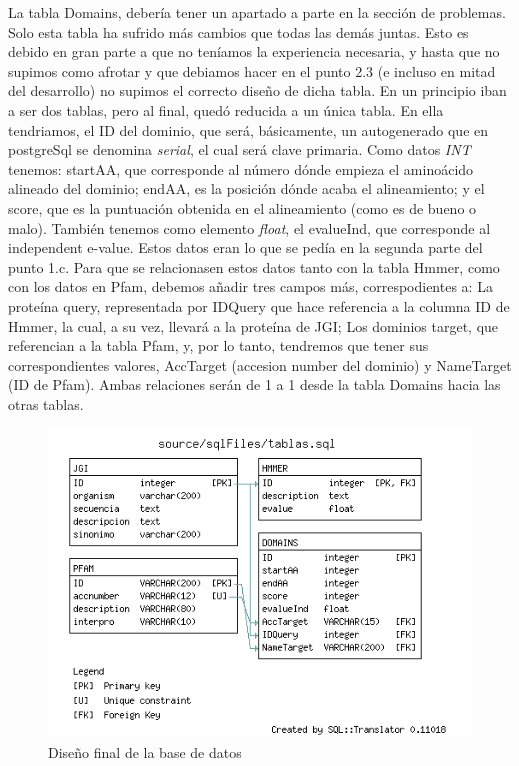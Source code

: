 \documentclass[11pt]{article} %
\begin{document}
La tabla Domains, deber\'ia tener un apartado a parte en la secci\'on de problemas. Solo esta tabla ha sufrido m\'as cambios que todas las dem\'as juntas. Esto es debido en gran parte a que no ten\'iamos la experiencia necesaria, y hasta que no supimos como afrotar y que debiamos hacer en el punto 2.3 (e incluso en mitad del desarrollo) no supimos el correcto dise\~no de dicha tabla. En un principio iban a ser dos tablas, pero al final, qued\'o reducida a un \'unica tabla. En ella tendriamos, el ID del dominio, que ser\'a, b\'asicamente, un autogenerado que en postgreSql se denomina \emph{serial}, el cual ser\'a clave primaria. Como datos \emph{INT} tenemos: startAA, que corresponde al n\'umero d\'onde empieza el amino\'acido alineado del dominio; endAA, es la posici\'on d\'onde acaba el alineamiento; y el score, que es la puntuaci\'on obtenida en el alineamiento (como es de bueno o malo). Tambi\'en tenemos como elemento \emph{float}, el evalueInd, que corresponde al independent e-value. Estos datos eran lo que se ped\'ia en la segunda parte del punto 1.c. Para que se relacionasen estos datos tanto con la tabla Hmmer, como con los datos en Pfam, debemos a\~nadir tres campos m\'as, correspodientes a: La prote\'ina query, representada por IDQuery que hace referencia a la columna ID de Hmmer, la cual, a su vez, llevar\'a a la prote\'ina de JGI; Los dominios target, que referencian a la tabla Pfam, y, por lo tanto, tendremos que tener sus correspondientes valores, AccTarget (accesion number del dominio) y NameTarget (ID de Pfam). Ambas relaciones ser\'an de 1 a 1 desde la tabla Domains hacia las otras tablas.


\begin{figure}
\centering
\includegraphics[width=15cm]{design}
\caption{Dise\~no final de la base de datos\label{fig:Design}}
\end{figure}
\end{document}
